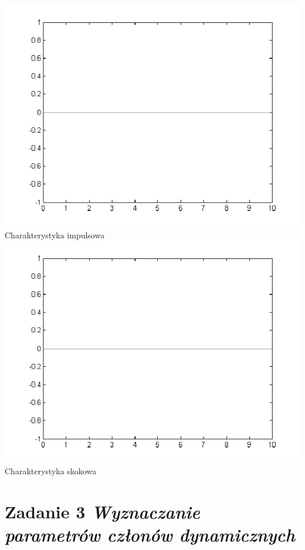 \documentclass[a4paper,10pt]{article}
\begin{document}
\begin{itemize}
\begin{itemize}
\newline \includegraphics[scale=0.9]{CW1-proporcjonalny-mimpuls.png}\newline Charakterystyka impulsowa
\newline \includegraphics[scale=0.9]{CW1-proporcjonalny-mskok.png}\newline Charakterystyka skokowa
  
\end{itemize}
\end{itemize}

\section{Zadanie 3 \textit{\small Wyznaczanie parametrów członów dynamicznych}}\label{sec:zad3}
\end{document}
